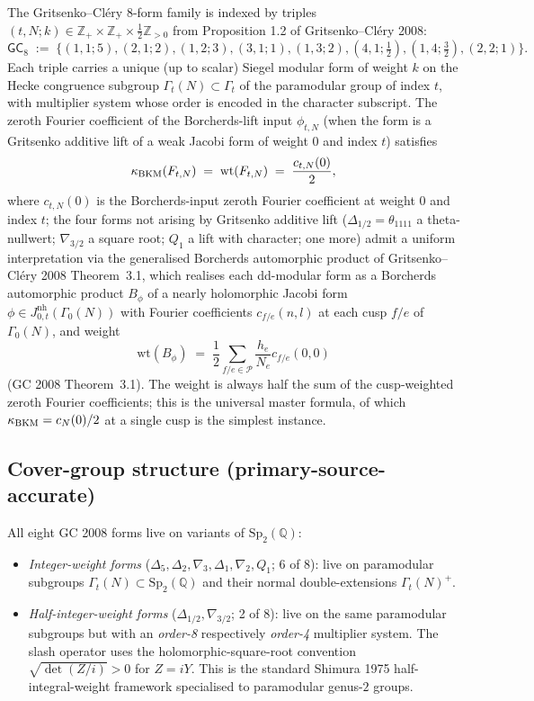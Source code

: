 The Gritsenko--Cl\'ery $8$-form family is indexed by triples
$(t, N; k) \in \mathbb{Z}_+ \times \mathbb{Z}_+ \times \tfrac{1}{2}\mathbb{Z}_{> 0}$
from Proposition 1.2 of Gritsenko--Cl\'ery 2008:
\[
 \mathsf{GC}_8 \;:=\;
 \bigl\{(1,1;5), (2,1;2), (1,2;3), (3,1;1), (1,3;2),
        (4,1;\tfrac{1}{2}), (1,4;\tfrac{3}{2}), (2,2;1)\bigr\}.
\]
Each triple carries a unique (up to scalar) Siegel modular form of
weight $k$ on the Hecke congruence subgroup $\Gamma_t(N) \subset \Gamma_t$
of the paramodular group of index $t$, with multiplier system whose
order is encoded in the character subscript. The zeroth Fourier
coefficient of the Borcherds-lift input $\phi_{t, N}$ (when the form
is a Gritsenko additive lift of a weak Jacobi form of weight $0$ and
index $t$) satisfies
\[
 \kappa_{\mathrm{BKM}}(F_{t, N}) \;=\; \mathrm{wt}(F_{t, N}) \;=\; \frac{c_{t, N}(0)}{2},
\]
where $c_{t, N}(0)$ is the Borcherds-input zeroth Fourier coefficient
at weight $0$ and index $t$; the four forms not arising by Gritsenko
additive lift ($\Delta_{1/2} = \theta_{1111}$ a theta-nullwert;
$\nabla_{3/2}$ a square root; $Q_1$ a lift with character;
one more) admit a uniform interpretation via the generalised
Borcherds automorphic product of Gritsenko--Cl\'ery 2008 Theorem~3.1,
which realises each dd-modular form as a Borcherds automorphic product
$B_\phi$ of a nearly holomorphic Jacobi form $\phi \in J^{\mathrm{nh}}_{0, t}(\Gamma_0(N))$
with Fourier coefficients $c_{f/e}(n, l)$ at each cusp $f/e$ of
$\Gamma_0(N)$, and weight
\[
 \mathrm{wt}(B_\phi) \;=\; \frac{1}{2} \sum_{f/e \in \mathcal{P}} \frac{h_e}{N_e}
   c_{f/e}(0, 0)
\]
(GC 2008 Theorem~3.1). The weight is always half the sum of the
cusp-weighted zeroth Fourier coefficients; this is the universal
master formula, of which $\kappa_{\mathrm{BKM}} = c_N(0)/2$ at a single cusp is the
simplest instance.

\subsection*{Cover-group structure (primary-source-accurate)}

All eight GC 2008 forms live on variants of $\mathrm{Sp}_2(\mathbb{Q})$:
\begin{itemize}
\item \emph{Integer-weight forms} ($\Delta_5, \Delta_2, \nabla_3,
\Delta_1, \nabla_2, Q_1$; 6 of 8): live on paramodular subgroups
$\Gamma_t(N) \subset \mathrm{Sp}_2(\mathbb{Q})$ and their normal
double-extensions $\Gamma_t(N)^+$.
\item \emph{Half-integer-weight forms} ($\Delta_{1/2}, \nabla_{3/2}$;
2 of 8): live on the same paramodular subgroups but with an \emph{order-8}
respectively \emph{order-4} multiplier system. The slash operator uses
the holomorphic-square-root convention $\sqrt{\det(Z/i)} > 0$ for
$Z = iY$. This is the standard Shimura 1975 half-integral-weight
framework specialised to paramodular genus-$2$ groups.
\end{itemize}

